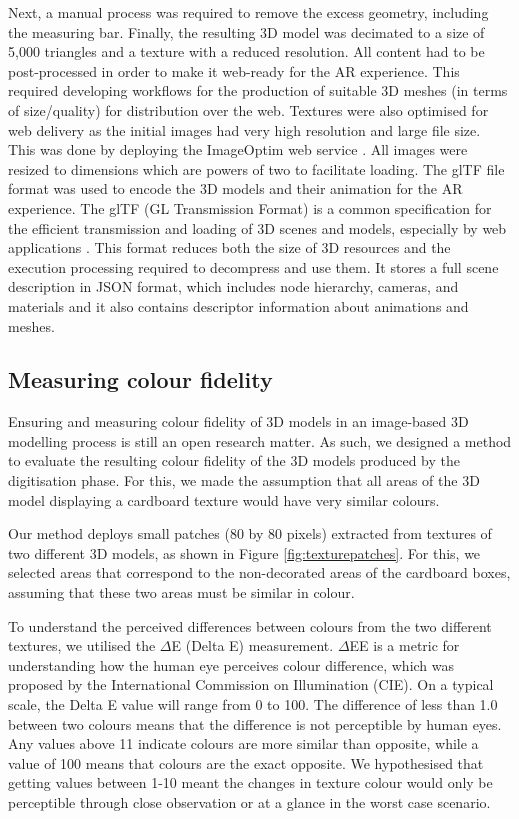 \documentclass[acmlarge,screen,dvipsnames]{acmart}
\begin{document}
Next, a manual process was required to remove the excess geometry,
including the measuring bar. Finally, the resulting 3D model was
decimated to a size of 5,000 triangles and a texture with a reduced
resolution. All content had to be post-processed in order to make it
web-ready for the AR experience. This required developing workflows for
the production of suitable 3D meshes (in terms of size/quality) for
distribution over the web.  %
Textures were also optimised for web delivery as the initial images had %
very high resolution and large file size. This was done by deploying %
the ImageOptim web service \cite{ImageOptim}.   %
All images were resized to dimensions which are powers of two
to facilitate loading. 
The glTF file format was used to encode the 3D models and their animation for the AR
experience. The glTF (GL Transmission Format) is a common specification for
the efficient transmission and loading of 3D scenes and models,
especially by web applications \cite{khronos}. This format reduces both the size
of 3D resources and the execution processing required to decompress and
use them. It stores a full scene description in JSON format, which
includes node hierarchy, cameras, and materials and it also contains
descriptor information about animations and meshes.


\subsection{Measuring colour fidelity} Ensuring and measuring colour
fidelity of 3D models in an image-based 3D modelling process is still an
open research matter. As such, we designed a method to evaluate the
resulting colour fidelity of the 3D models produced by the
digitisation phase. For this, we made the assumption that all areas of
the 3D model displaying a cardboard texture would have very similar
colours.

Our method deploys small patches (80 by 80 pixels) extracted from
textures of two different 3D models, as shown in Figure
\ref{fig:texturepatches}. For this, we selected areas that correspond to the
non-decorated areas of the cardboard boxes, assuming that these two areas
must be similar in colour. 


To understand the perceived differences between colours from the two different textures, we utilised the $\Delta$E (Delta E) measurement. $\Delta$EE is a metric for understanding how the human eye perceives
colour difference, which was proposed by the International Commission on
Illumination (CIE). On a typical scale, the Delta E value will range
from 0 to 100. The difference of less than 1.0 between two colours means
that the difference is not perceptible by human eyes. Any values above
11 indicate colours are more similar than opposite, while a value of 100
means that colours are the exact opposite. We hypothesised that getting
values between 1-10 meant the changes in texture colour would only be
perceptible through close observation or at a glance in the worst
case scenario.
\end{document}
